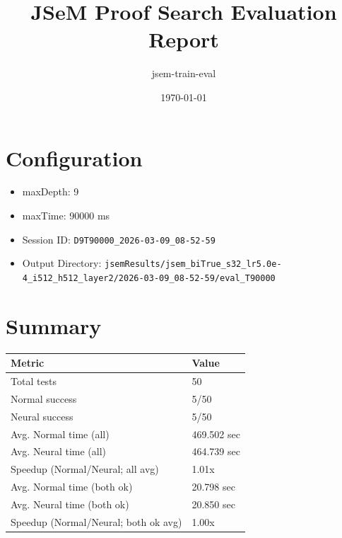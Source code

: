 \documentclass[a4paper,10pt]{article}
\title{JSeM Proof Search Evaluation Report}
\author{jsem-train-eval}
\date{\today}
\begin{document}
\maketitle

\section{Configuration}
\begin{itemize}
\item maxDepth: 9
\item maxTime: 90000 ms
\item Session ID: \texttt{D9T90000\_2026-03-09\_08-52-59}
\item Output Directory: \texttt{jsemResults/jsem\_biTrue\_s32\_lr5.0e-4\_i512\_h512\_layer2/2026-03-09\_08-52-59/eval\_T90000}
\end{itemize}

\section{Summary}
\begin{tabular}{ll}
\toprule
\textbf{Metric} & \textbf{Value} \\
\midrule
Total tests & 50 \\
Normal success & 5/50 \\
Neural success & 5/50 \\
\midrule
Avg. Normal time (all) & 469.502 sec \\
Avg. Neural time (all) & 464.739 sec \\
Speedup (Normal/Neural; all avg) & 1.01x \\
Avg. Normal time (both ok) & 20.798 sec \\
Avg. Neural time (both ok) & 20.850 sec \\
Speedup (Normal/Neural; both ok avg) & 1.00x \\
\bottomrule
\end{tabular}
\end{document}
